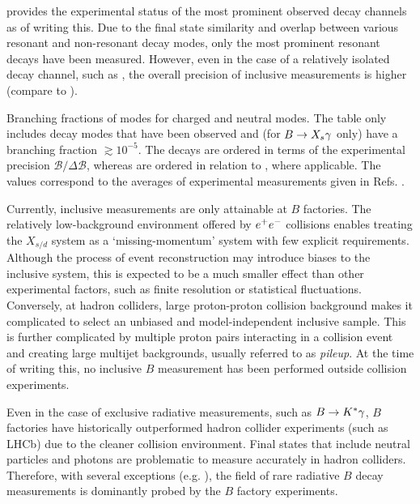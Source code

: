  provides the experimental status of the most prominent observed \BtoXsdgamma decay channels as of writing this.
Due to the final state similarity and overlap between various resonant and non-resonant decay modes, only the most prominent resonant decays have been measured.
However, even in the case of a relatively isolated decay channel, such as \BtoKstargamma, the overall precision of inclusive measurements is higher (compare to ).

{\renewcommand{\arraystretch}{1.2}
\begin{table}[!htbp]
    \centering
    \caption{\label{tab:btosgamma_bfs} 
    Branching fractions of \BtoXsgamma modes for charged and neutral modes.
    The table only includes decay modes that have been observed and (for $\BtoXsgamma$ only) have a branching fraction $\gtrsim10^{-5}$.
    The \Bp decays are ordered in terms of the experimental precision $\mathcal{B}/\Delta\mathcal{B}$, whereas \Bz are ordered in relation to \Bp, where applicable.
    The values correspond to the averages of experimental measurements given in Refs. \cite{Amhis:2022mac,Workman:2022ynf}.
    }
    
\end{table}
}

Currently, inclusive measurements are only attainable at $B$ factories.
The relatively low-background environment offered by $e^+e^-$ collisions enables treating the $X_{s/d}$ system as a `missing-momentum' system with few explicit requirements.
Although the process of event reconstruction may introduce biases to the inclusive system, this is expected to be a much smaller effect than other experimental factors, such as finite resolution or statistical fluctuations.
Conversely, at hadron colliders,
large proton-proton collision background makes it complicated to select an unbiased and model-independent inclusive sample.
This is further complicated by multiple proton pairs interacting in a collision event and creating large multijet backgrounds, usually referred to as \textit{pileup}.
At the time of writing this, no inclusive $B$ measurement has been performed outside \epem collision experiments.

Even in the case of exclusive radiative measurements, such as $B\rightarrow K^*\gamma$, $B$ factories have historically outperformed hadron collider experiments (such as LHCb) due to the cleaner \epem collision environment.
Final states that include neutral particles and photons are problematic to measure accurately in hadron colliders.
Therefore, with several exceptions (e.g. \cite{Bellee:2019qbt}), the field of rare radiative $B$ decay measurements is dominantly probed by the $B$ factory experiments.



